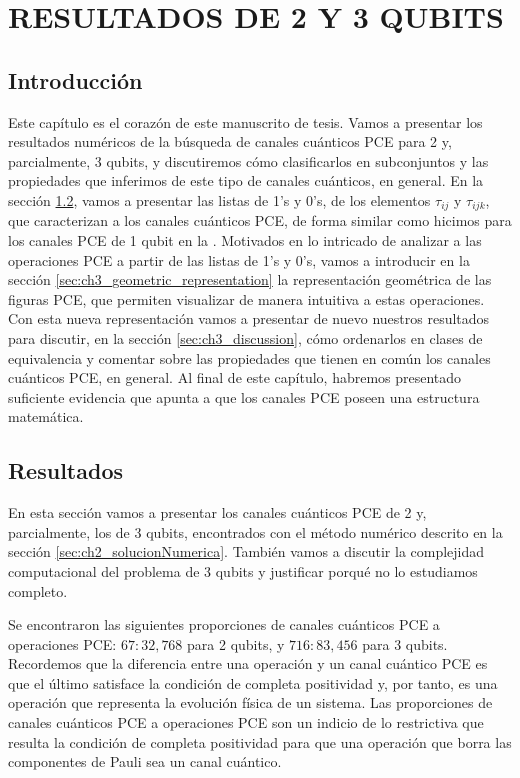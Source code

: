 \chapter{RESULTADOS DE 2 Y 3 QUBITS}
\section{Introducción} %
Este capítulo es el corazón de este manuscrito de tesis. 
Vamos a presentar los resultados numéricos  de la búsqueda de 
canales cuánticos PCE para 2 y, parcialmente, 3 qubits,
y discutiremos cómo clasificarlos en subconjuntos y las propiedades que 
inferimos de este tipo de canales cuánticos, en general.
En la sección \ref{sec:ch3_resultados}, vamos a presentar 
las listas de 1's y 0's, de los elementos $\tau_{ij}$ y $\tau_{ijk}$,
que caracterizan a los canales cuánticos PCE,
de forma similar como hicimos para los canales PCE de 1 qubit 
en la . Motivados en lo intricado de analizar a 
las operaciones PCE a partir de las 
listas de 1's y 0's, vamos a introducir en la sección 
\ref{sec:ch3_geometric_representation}
la representación geométrica de las figuras PCE, que permiten visualizar
de manera intuitiva a estas operaciones. Con esta
nueva representación vamos a presentar de nuevo nuestros resultados
para discutir, en la sección \ref{sec:ch3_discussion}, cómo ordenarlos 
en clases de equivalencia y comentar sobre las 
propiedades que tienen en común los canales cuánticos PCE, en general. 
Al final de este capítulo, 
habremos presentado suficiente evidencia que apunta a que los canales PCE
poseen una estructura matemática.

\section{Resultados}\label{sec:ch3_resultados} %
En esta sección vamos a presentar los canales cuánticos PCE de 2 y,
parcialmente, los de 3 qubits, 
encontrados con el método numérico descrito en la sección 
\ref{sec:ch2_solucionNumerica}. También vamos a discutir la complejidad 
computacional del problema de 3 qubits y justificar porqué no lo estudiamos completo.

Se encontraron las siguientes proporciones de canales cuánticos PCE a 
operaciones PCE: $67:32,768$ para 2 qubits, y $716:83,456$ para 
3 qubits. Recordemos que la diferencia entre una operación y un canal cuántico PCE
es que el último satisface la condición de completa positividad y, por tanto, 
es una operación que representa la evolución física de un sistema. 
Las proporciones de canales cuánticos PCE a operaciones PCE son un indicio 
de lo restrictiva que resulta la condición de completa positividad para que 
una operación que borra las componentes de Pauli sea un canal cuántico.

